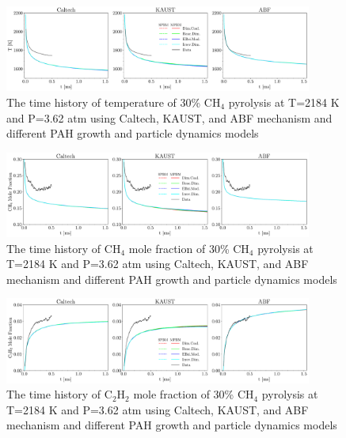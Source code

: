 \begin{figure}[H]
	\centering
	\includegraphics[width=0.9\textwidth]{Figures/Results/Shocktube/Stanford/june/stsh_mech_compare_T.pdf}
	\caption{The time history of temperature of 30\% $\mathrm{CH_4}$ pyrolysis at T=2184 K and P=3.62 atm using Caltech, KAUST, and ABF mechanism and different PAH growth and particle dynamics models}
	\label{fig:shocktubestT} 
\end{figure}

\begin{figure}[H]
	\centering
	\includegraphics[width=0.9\textwidth]{Figures/Results/Shocktube/Stanford/june/stsh_mech_compare_CH4.pdf}
	\caption{The time history of $\mathrm{CH_4}$ mole fraction of 30\% $\mathrm{CH_4}$ pyrolysis at T=2184 K and P=3.62 atm using Caltech, KAUST, and ABF mechanism and different PAH growth and particle dynamics models}
	\label{fig:shocktubestch4} 
\end{figure}

\begin{figure}[H]
	\centering
	\includegraphics[width=0.9\textwidth]{Figures/Results/Shocktube/Stanford/june/stsh_mech_compare_C2H2.pdf}
	\caption{The time history of $\mathrm{C_2H_2}$ mole fraction of 30\% $\mathrm{CH_4}$ pyrolysis at T=2184 K and P=3.62 atm using Caltech, KAUST, and ABF mechanism and different PAH growth and particle dynamics models}
	\label{fig:shocktubestc2h2} 
\end{figure}

